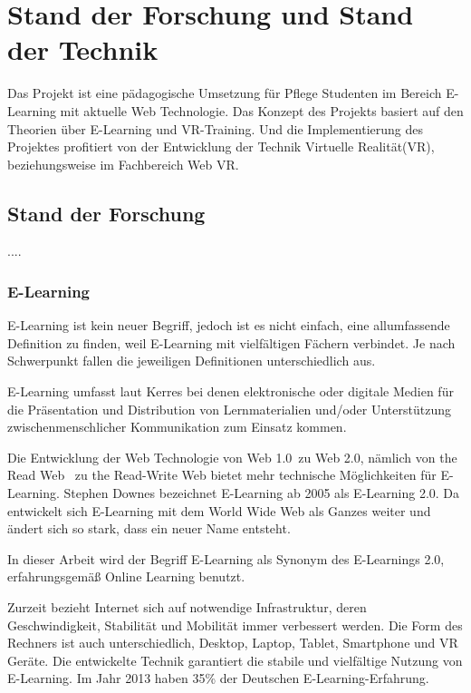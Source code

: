 \chapter{Stand der Forschung und Stand der Technik}

Das Projekt ist eine pädagogische Umsetzung für Pflege Studenten im Bereich E-Learning mit aktuelle Web Technologie. Das Konzept des Projekts basiert auf den Theorien über E-Learning und VR-Training. Und die Implementierung des Projektes profitiert von der Entwicklung der Technik Virtuelle Realität(VR), beziehungsweise im Fachbereich Web VR.

\section{Stand der Forschung}

....

 \subsection{E-Learning}
 E-Learning ist kein neuer Begriff, jedoch ist es nicht einfach, eine allumfassende Definition zu finden, weil E-Learning mit vielfältigen Fächern verbindet. Je nach Schwerpunkt fallen die jeweiligen Definitionen unterschiedlich aus.

E-Learning umfasst laut Kerres \citep{1} \glqq bei denen elektronische oder digitale Medien für die Präsentation und Distribution von Lernmaterialien und/oder Unterstützung zwischenmenschlicher Kommunikation zum Einsatz kommen.\grqq

Die Entwicklung der Web Technologie von \glqq Web 1.0\grqq\ zu \glqq Web 2.0\grqq  \citep{3}, nämlich von \glqq the Read Web \grqq\ zu \glqq the Read-Write Web\grqq \citep{4} bietet mehr technische Möglichkeiten für E-Learning. Stephen Downes \citep{2} bezeichnet E-Learning ab 2005 als E-Learning 2.0. Da \glqq entwickelt sich E-Learning mit dem World Wide Web als Ganzes weiter und ändert sich so stark, dass ein neuer Name entsteht.\grqq

In dieser Arbeit wird der Begriff E-Learning als Synonym des E-Learnings 2.0, erfahrungsgemäß Online Learning benutzt.
 
Zurzeit bezieht Internet sich auf notwendige Infrastruktur, deren Geschwindigkeit, Stabilität und Mobilität immer verbessert werden. Die Form des Rechners ist auch unterschiedlich, Desktop, Laptop, Tablet, Smartphone und VR Geräte. Die entwickelte Technik garantiert die stabile und vielfältige Nutzung von E-Learning. Im Jahr 2013 haben 35\% der Deutschen E-Learning-Erfahrung.


